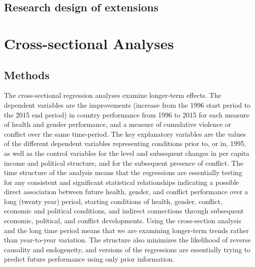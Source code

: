 \documentclass[12pt]{article}
\begin{document}
\subsection{Research design of extensions}


\section{Cross-sectional Analyses}


\subsection{Methods}


The cross-sectional regression analyses examine longer-term effects.
The dependent variables are the improvements (increase from the 1996 start period to the 2015 end period) in country performance from 1996 to 2015 for each measure of health and gender performance, and a measure of cumulative violence or conflict over the same time-period.
The key explanatory variables are the values of the different dependent variables representing conditions prior to, or in, 1995, as well as the control variables for the level and subsequent changes in per capita income and political structure, and for the subsequent presence of conflict. The time structure of the analysis means that the regressions are essentially testing for any consistent and significant statistical relationships indicating a possible direct association between future health, gender, and conflict performance over a long (twenty year) period, starting conditions of health, gender, conflict, economic and political conditions, and indirect connections through subsequent economic, political, and conflict developments. Using the cross-section analysis and the long time period means that we are examining longer-term trends rather than year-to-year variation. The structure also minimizes the likelihood of reverse causality and endogeneity, and versions of the regressions are essentially trying to predict future performance using only prior information.
\end{document}
